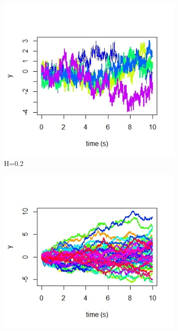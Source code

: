 \documentclass{article}
\begin{document}
\begin{figure}[h]
    \centering
    \begin{subfigure}{0.32\textwidth}
        \centering
        \includegraphics[width=\textwidth]{specsim1.jpeg}
        \caption{H=0.2}
    \end{subfigure}\hfill
    \begin{subfigure}{0.32\textwidth}
        \centering
        \includegraphics[width=\textwidth]{specsim2.jpeg}

\end{subfigure}
\end{figure}
\end{document}
